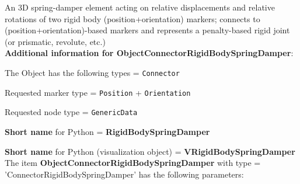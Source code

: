 \label{sec:item:ObjectConnectorRigidBodySpringDamper}
An 3D spring-damper element acting on relative displacements and relative rotations of two rigid body (position+orientation) markers; connects to (position+orientation)-based markers and represents a penalty-based rigid joint (or prismatic, revolute, etc.)\vspace{12pt}
 \\{\bf Additional information for ObjectConnectorRigidBodySpringDamper}:
\bi
  \item The Object has the following types = \texttt{Connector}
  \item Requested marker type = \texttt{Position} + \texttt{Orientation}
  \item Requested node type = \texttt{GenericData}
  \item {\bf Short name} for Python = {\bf RigidBodySpringDamper}  \item {\bf Short name} for Python (visualization object) = {\bf VRigidBodySpringDamper}\ei
\vspace{12pt} \noindent The item {\bf ObjectConnectorRigidBodySpringDamper} with type = 'ConnectorRigidBodySpringDamper' has the following parameters:\vspace{-1cm}\\ 
